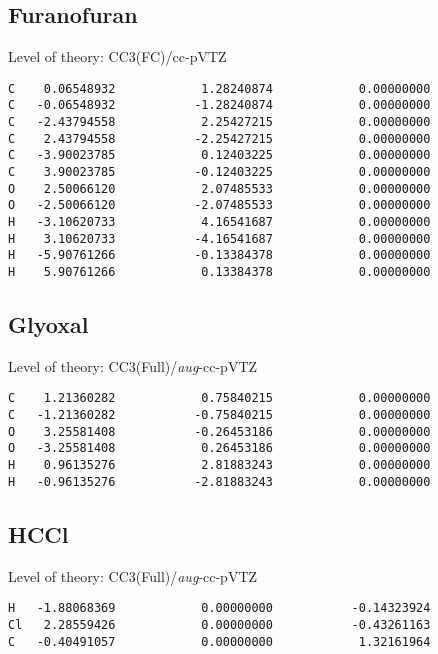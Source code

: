 \documentclass[journal=jctcce,manuscript=article,layout=traditional]{achemso}
\newcommand{\TZ}{cc-pVTZ}
\newcommand{\AVTZ}{\emph{aug}-cc-pVTZ}
\begin{document}
\subsection*{Furanofuran}

\begin{singlespace}
Level of theory: CC3(FC)/{\TZ}
\begin{verbatim}
C    0.06548932            1.28240874            0.00000000
C   -0.06548932           -1.28240874            0.00000000
C   -2.43794558            2.25427215            0.00000000
C    2.43794558           -2.25427215            0.00000000
C   -3.90023785            0.12403225            0.00000000
C    3.90023785           -0.12403225            0.00000000
O    2.50066120            2.07485533            0.00000000
O   -2.50066120           -2.07485533            0.00000000
H   -3.10620733            4.16541687            0.00000000
H    3.10620733           -4.16541687            0.00000000
H   -5.90761266           -0.13384378            0.00000000
H    5.90761266            0.13384378            0.00000000
\end{verbatim}
\end{singlespace}

\subsection*{Glyoxal}

\begin{singlespace}
Level of theory: CC3(Full)/{\AVTZ}
\begin{verbatim}
C    1.21360282            0.75840215            0.00000000
C   -1.21360282           -0.75840215            0.00000000  
O    3.25581408           -0.26453186            0.00000000
O   -3.25581408            0.26453186            0.00000000  
H    0.96135276            2.81883243            0.00000000
H   -0.96135276           -2.81883243            0.00000000 
\end{verbatim}
\end{singlespace}

\subsection*{HCCl}

\begin{singlespace}
Level of theory: CC3(Full)/{\AVTZ}
\begin{verbatim}
H   -1.88068369            0.00000000           -0.14323924
Cl   2.28559426            0.00000000           -0.43261163
C   -0.40491057            0.00000000            1.32161964         
\end{verbatim}
\end{singlespace}
\end{document}
